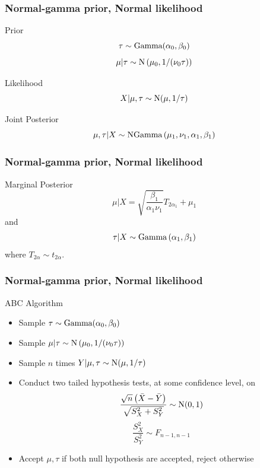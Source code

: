 \documentclass{beamer}
\begin{document}
\begin{frame}
\frametitle{Normal-gamma prior, Normal likelihood}
\begin{block}{Prior}
\begin{equation}
\tau\sim\textup{Gamma}(\alpha_0,\beta_0)
\end{equation}
\begin{equation}
\mu|\tau\sim\textup{N}\left(\mu_0,1/(\nu_0\tau)\right)
\end{equation}
\end{block}
\pause
\begin{block}{Likelihood}
\begin{equation}
X|\mu,\tau\sim\textup{N}(\mu,1/\tau)
\end{equation}
\end{block}
\pause
\begin{block}{Joint Posterior}
\begin{equation}
\mu,\tau|X\sim\textup{NGamma}
\left(
	\mu_1,
	\nu_1,
	\alpha_1,
	\beta_1
\right)
\end{equation}
\end{block}

\end{frame}

\begin{frame}
\frametitle{Normal-gamma prior, Normal likelihood}
\begin{block}{Marginal Posterior}
\begin{equation}
\mu|X = \sqrt{\dfrac{\beta_1}{\alpha_1\nu_1}} T_{2\alpha_1}
+ \mu_1
\end{equation}
and
\begin{equation}
\tau|X \sim \textup{Gamma}\left(
\alpha_1,\beta_1
\right)
\end{equation}
where $T_{2\alpha}\sim t_{2\alpha}$.
\end{block}
\end{frame}

\begin{frame}
\frametitle{Normal-gamma prior, Normal likelihood}
\begin{block}{ABC Algorithm}
\begin{itemize}
	\item Sample $\tau\sim\textup{Gamma}(\alpha_0,\beta_0)$
	\item Sample $\mu|\tau\sim\textup{N}\left(\mu_0,1/(\nu_0\tau)\right)$
	\item Sample $n$ times $Y|\mu,\tau\sim\textup{N}(\mu,1/\tau)$
	\pause
	\item Conduct two tailed hypothesis tests, at some confidence level, on
	\begin{equation}
	\dfrac{\sqrt{n}\left(\bar{X}-\bar{Y}\right)}{\sqrt{S_X^2+S_Y^2}}\sim\textup{N}(0,1)
	\end{equation}
	\begin{equation}
	\dfrac{S_X^2}{S_Y^2}\sim F_{n-1,n-1}
	\end{equation}
	\item Accept $\mu,\tau$ if both null hypothesis are accepted, reject otherwise
\end{itemize}
\end{block}
\end{frame}
\end{document}
